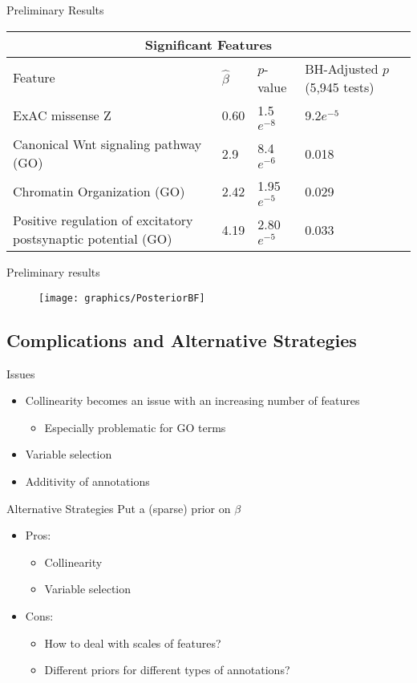 \documentclass[bigger]{beamer}
\begin{document}
\begin{frame}{Preliminary Results}
  \begin{tabular}{ |p{5cm}||p{1cm}|p{2cm}|p{2.5cm}|  }
 \hline
 \multicolumn{4}{|c|}{Significant Features} \\
 \hline
 Feature& $\hat{\beta}$ &$p$-value& BH-Adjusted $p$ (5,945 tests)\\
 \hline
ExAC missense Z & 0.60 & 1.5$e^{-8}$ & 9.2$e^{-5}$ \\
\hline
 Canonical Wnt signaling pathway (GO)   & 2.9    &8.4$e^{-6}$& 0.018\\
\hline
 Chromatin Organization (GO) &2.42 & 1.95$e^{-5}$ &  0.029\\
\hline
 Positive regulation of excitatory postsynaptic potential (GO)&4.19 & 2.80$e^{-5}$ &  0.033\\
 \hline
\end{tabular}
\end{frame}

\begin{frame}{Preliminary results}
\begin{figure}

  \texttt{[image: graphics/PosteriorBF]}
\end{figure}
\end{frame}

\subsection{Complications and Alternative Strategies}
\begin{frame}{Issues}
  \begin{itemize}
  \item Collinearity becomes an issue with an increasing number of features
    \begin{itemize}
    \item Especially problematic for GO terms 
    \end{itemize}
  \item Variable selection
  \item Additivity of annotations
  \end{itemize}
\end{frame}


\begin{frame}{Alternative Strategies}
  Put a (sparse) prior on $\beta$
  \begin{itemize}
  \item Pros:
    \begin{itemize}
    \item Collinearity
    \item Variable selection
    \end{itemize}
  \item Cons:
    \begin{itemize}    
    \item How to deal with scales of features?
    \item Different priors for different types of annotations?
    \end{itemize}
  \end{itemize}
\end{frame}

    
\end{document}
